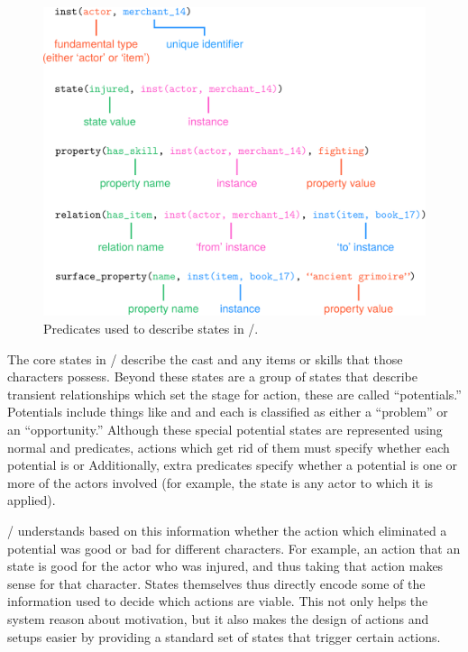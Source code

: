 \begin{figure}[!t]
\includegraphics[width=\textwidth]{fig/cropped-dunyazad-states.pdf}
\caption[\dunyazad/'s state predicates]{Predicates used to describe states in \dunyazad/.}
\label{fig:dunyazad-states}
\end{figure}


The core states in \dunyazad/ describe the cast and any items or skills that those characters possess.
%
Beyond these states are a group of states that describe transient relationships which set the stage for action, these are called ``potentials.''
%
Potentials include things like   and  and each is classified as either a ``problem'' or an ``opportunity.''
%
Although these special potential states are represented using normal   and  predicates, actions which get rid of them must specify whether each potential is   or 
%
Additionally, extra predicates specify whether a potential is  one or more of the actors involved (for example, the  state is  any actor to which it is applied).


\dunyazad/ understands based on this information whether the action which eliminated a potential was good or bad for different characters.
%
For example, an action that  an  state is good for the actor who was injured, and thus taking that action makes sense for that character.
%
States themselves thus directly encode some of the information used to decide which actions are viable.
%
This not only helps the system reason about motivation, but it also makes the design of actions and setups easier by providing a standard set of states that trigger certain actions.


